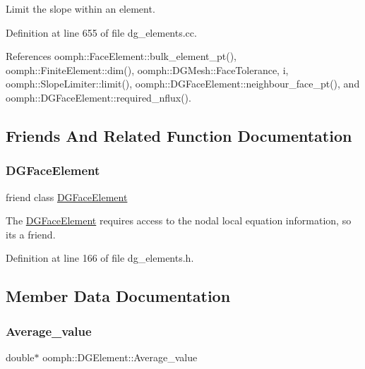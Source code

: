 Limit the slope within an element. 

Definition at line 655 of file dg\+\_\+elements.\+cc.



References oomph\+::\+Face\+Element\+::bulk\+\_\+element\+\_\+pt(), oomph\+::\+Finite\+Element\+::dim(), oomph\+::\+D\+G\+Mesh\+::\+Face\+Tolerance, i, oomph\+::\+Slope\+Limiter\+::limit(), oomph\+::\+D\+G\+Face\+Element\+::neighbour\+\_\+face\+\_\+pt(), and oomph\+::\+D\+G\+Face\+Element\+::required\+\_\+nflux().



\subsection{Friends And Related Function Documentation}
\mbox{\label{classoomph_1_1DGElement_a0f4002a66e7e3bc5b0b40d9b201e596f}} 
\subsubsection{\texorpdfstring{D\+G\+Face\+Element}{DGFaceElement}}
{\footnotesize\ttfamily friend class \hyperlink{classoomph_1_1DGFaceElement}{D\+G\+Face\+Element}\hspace{0.3cm}{\ttfamily [friend]}}



The \hyperlink{classoomph_1_1DGFaceElement}{D\+G\+Face\+Element} requires access to the nodal local equation information, so it\textquotesingle{}s a friend. 



Definition at line 166 of file dg\+\_\+elements.\+h.



\subsection{Member Data Documentation}
\mbox{\label{classoomph_1_1DGElement_a63897eb72ffa8de1e8dbb48047aaef56}} 
\subsubsection{\texorpdfstring{Average\+\_\+value}{Average\_value}}
{\footnotesize\ttfamily double$\ast$ oomph\+::\+D\+G\+Element\+::\+Average\+\_\+value\hspace{0.3cm}{\ttfamily [protected]}}




